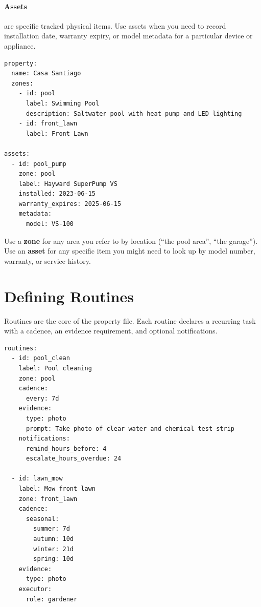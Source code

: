 \paragraph{Assets} are specific tracked physical items. Use assets when you need to record
installation date, warranty expiry, or model metadata for a particular device or appliance.

\begin{verbatim}
property:
  name: Casa Santiago
  zones:
    - id: pool
      label: Swimming Pool
      description: Saltwater pool with heat pump and LED lighting
    - id: front_lawn
      label: Front Lawn

assets:
  - id: pool_pump
    zone: pool
    label: Hayward SuperPump VS
    installed: 2023-06-15
    warranty_expires: 2025-06-15
    metadata:
      model: VS-100
\end{verbatim}

\begin{tcolorbox}[colback=yellow!10,colframe=orange!70,title=Rule of Thumb]
  Use a \textbf{zone} for any area you refer to by location (``the pool area'', ``the
  garage''). Use an \textbf{asset} for any specific item you might need to look up by model
  number, warranty, or service history.
\end{tcolorbox}

\section{Defining Routines}
\label{sec:authoring-routines}

Routines are the core of the property file. Each routine declares a recurring task with a
cadence, an evidence requirement, and optional notifications.

\begin{verbatim}
routines:
  - id: pool_clean
    label: Pool cleaning
    zone: pool
    cadence:
      every: 7d
    evidence:
      type: photo
      prompt: Take photo of clear water and chemical test strip
    notifications:
      remind_hours_before: 4
      escalate_hours_overdue: 24

  - id: lawn_mow
    label: Mow front lawn
    zone: front_lawn
    cadence:
      seasonal:
        summer: 7d
        autumn: 10d
        winter: 21d
        spring: 10d
    evidence:
      type: photo
    executor:
      role: gardener
\end{verbatim}

